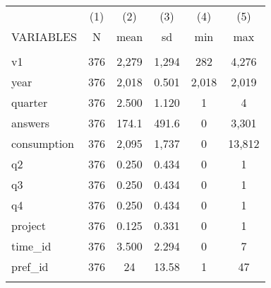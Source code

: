 \documentclass[]{article}
\begin{document}
\begin{tabular}{lccccc} \hline
 & (1) & (2) & (3) & (4) & (5) \\
VARIABLES & N & mean & sd & min & max \\ \hline
 &  &  &  &  &  \\
v1 & 376 & 2,279 & 1,294 & 282 & 4,276 \\
year & 376 & 2,018 & 0.501 & 2,018 & 2,019 \\
quarter & 376 & 2.500 & 1.120 & 1 & 4 \\
answers & 376 & 174.1 & 491.6 & 0 & 3,301 \\
consumption & 376 & 2,095 & 1,737 & 0 & 13,812 \\
q2 & 376 & 0.250 & 0.434 & 0 & 1 \\
q3 & 376 & 0.250 & 0.434 & 0 & 1 \\
q4 & 376 & 0.250 & 0.434 & 0 & 1 \\
project & 376 & 0.125 & 0.331 & 0 & 1 \\
time\_id & 376 & 3.500 & 2.294 & 0 & 7 \\
pref\_id & 376 & 24 & 13.58 & 1 & 47 \\
 &  &  &  &  &  \\ \hline
\end{tabular}
\end{document}
